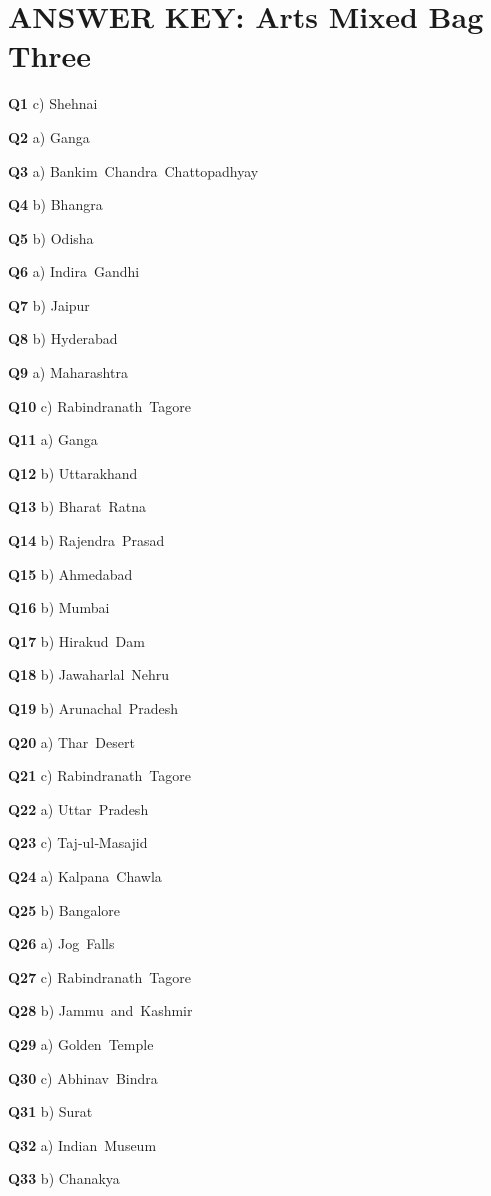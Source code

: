 \section{ANSWER KEY: Arts Mixed Bag Three}

\textbf{Q1} c) Shehnai\par
\textbf{Q2} a) Ganga\par
\textbf{Q3} a) Bankim Chandra Chattopadhyay\par
\textbf{Q4} b) Bhangra\par
\textbf{Q5} b) Odisha\par
\textbf{Q6} a) Indira Gandhi\par
\textbf{Q7} b) Jaipur\par
\textbf{Q8} b) Hyderabad\par
\textbf{Q9} a) Maharashtra\par
\textbf{Q10} c) Rabindranath Tagore\par
\textbf{Q11} a) Ganga\par
\textbf{Q12} b) Uttarakhand\par
\textbf{Q13} b) Bharat Ratna\par
\textbf{Q14} b) Rajendra Prasad\par
\textbf{Q15} b) Ahmedabad\par
\textbf{Q16} b) Mumbai\par
\textbf{Q17} b) Hirakud Dam\par
\textbf{Q18} b) Jawaharlal Nehru\par
\textbf{Q19} b) Arunachal Pradesh\par
\textbf{Q20} a) Thar Desert\par
\textbf{Q21} c) Rabindranath Tagore\par
\textbf{Q22} a) Uttar Pradesh\par
\textbf{Q23} c) Taj‑ul‑Masajid\par
\textbf{Q24} a) Kalpana Chawla\par
\textbf{Q25} b) Bangalore\par
\textbf{Q26} a) Jog Falls\par
\textbf{Q27} c) Rabindranath Tagore\par
\textbf{Q28} b) Jammu and Kashmir\par
\textbf{Q29} a) Golden Temple\par
\textbf{Q30} c) Abhinav Bindra\par
\textbf{Q31} b) Surat\par
\textbf{Q32} a) Indian Museum\par
\textbf{Q33} b) Chanakya\par
